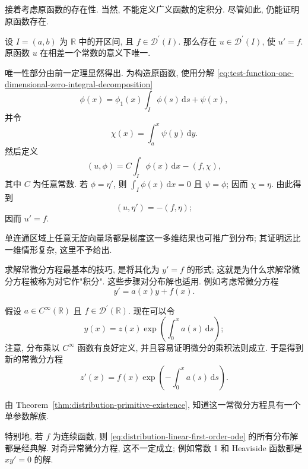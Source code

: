 接着考虑原函数的存在性. 当然, 不能定义广义函数的定积分. 尽管如此, 仍能证明原函数存在.

\begin{Theorem}
\label{thm:distribution-primitive-existence}
设 $I=(a,b)$ 为 $\mathbb{R}$ 中的开区间, 且 $f\in\mathcal{D}^{\prime}(I)$. 那么存在 $u\in\mathcal{D}^{\prime}(I)$, 使 $u'=f$. 原函数 $u$ 在相差一个常数的意义下唯一.
\end{Theorem}

\begin{Proof}
唯一性部分由前一定理显然得出. 为构造原函数, 使用分解 \eqref{eq:test-function-one-dimensional-zero-integral-decomposition}
\begin{equation}\label{eq:primitive-construction-test-decomposition}
\phi(x)=\phi_1(x)\int_I\phi(s)\,\mathrm{d}s+\psi(x),
\end{equation}
并令
\begin{equation}\label{eq:primitive-construction-zero-integral-test-primitive}
\chi(x)=\int_a^x\psi(y)\,\mathrm{d}y.
\end{equation}
然后定义
\begin{equation}\label{eq:primitive-distribution-definition-pairing}
(u,\phi)=C\int_I\phi(x)\,\mathrm{d}x-(f,\chi),
\end{equation}
其中 $C$ 为任意常数. 若 $\phi=\eta'$, 则 $\int_I\phi(x)\,\mathrm{d}x=0$ 且 $\psi=\phi$; 因而 $\chi=\eta$. 由此得到
\begin{equation}\label{eq:primitive-distribution-derivative-check}
(u,\eta')=-(f,\eta);
\end{equation}
因而 $u'=f$.
\end{Proof}

单连通区域上任意无旋向量场都是梯度这一多维结果也可推广到分布; 其证明远比一维情形复杂, 这里不予给出.

求解常微分方程最基本的技巧, 是将其化为 $y'=f$ 的形式; 这就是为什么求解常微分方程被称为对它作"积分". 这些步骤对分布解也适用. 例如考虑常微分方程
\begin{equation}\label{eq:distribution-linear-first-order-ode}
y'=a(x)y+f(x).
\end{equation}


假设 $a\in C^\infty(\mathbb{R})$ 且 $f\in\mathcal{D}^{\prime}(\mathbb{R})$. 现在可以令
\begin{equation}\label{eq:distribution-ode-integrating-factor-substitution}
y(x)=z(x)\exp\left(\int_0^xa(s)\,\mathrm{d}s\right);
\end{equation}
注意, 分布乘以 $C^\infty$ 函数有良好定义, 并且容易证明微分的乘积法则成立. 于是得到新的常微分方程
\begin{equation}\label{eq:distribution-ode-primitive-reduction}
z'(x)=f(x)\exp\left(-\int_0^xa(s)\,\mathrm{d}s\right).
\end{equation}


由 Theorem~\ref{thm:distribution-primitive-existence}, 知道这一常微分方程具有一个单参数解族.

特别地, 若 $f$ 为连续函数, 则 \eqref{eq:distribution-linear-first-order-ode} 的所有分布解都是经典解. 对奇异常微分方程, 这不一定成立; 例如常数 1 和 Heaviside 函数都是 $xy'=0$ 的解.
